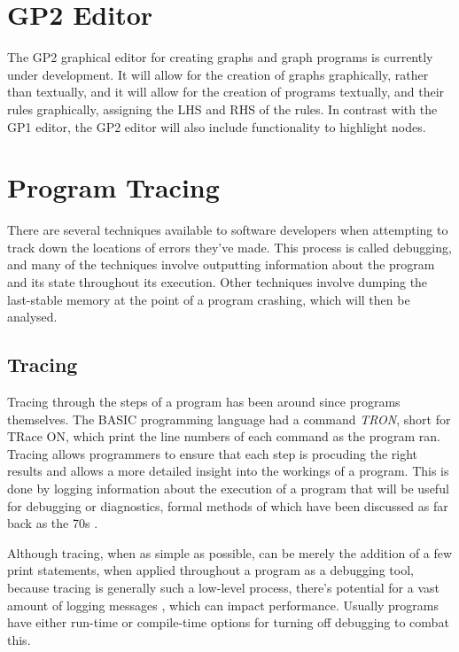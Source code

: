 \documentclass{UoYCSproject}
\begin{document}

\section{GP2 Editor}
The GP2 graphical editor for creating graphs and graph programs is currently under development. It will allow for the creation of graphs graphically, rather than textually, and it will allow for the creation of programs textually, and their rules graphically, assigning the LHS and RHS of the rules. In contrast with the GP1 editor, the GP2 editor will also include functionality to highlight nodes. %

\section{Program Tracing}
There are several techniques available to software developers when attempting to track down the locations of errors they've made. This process is called debugging, and many of the techniques involve outputting information about the program and its state throughout its execution. Other techniques involve dumping the last-stable memory at the point of a program crashing, which will then be analysed. 

\subsection{Tracing}
Tracing through the steps of a program has been around since programs themselves. The BASIC programming language had a command \emph{TRON}, short for TRace ON, which print the line numbers of each command as the program ran. 
Tracing allows programmers to ensure that each step is procuding the right results and allows a more detailed insight into the workings of a program. This is done by logging information about the execution of a program that will be useful for debugging or diagnostics, formal methods of which have been discussed as far back as the 70s \cite{psych_debug, code_walkthroughs}.

Although tracing, when as simple as possible, can be merely the addition of a few print statements, when applied throughout a program as a debugging tool, because tracing is generally such a low-level process, there's potential for a vast amount of logging messages \cite{}, which can impact performance. Usually programs have either run-time or compile-time options for turning off debugging to combat this. %
\end{document}
